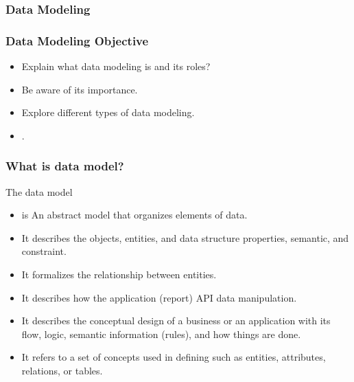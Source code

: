 \VideoClassification[column=1, colour=red]
\subsubsection{Data Modeling}


\begin{frame}
    \frametitle{Data Modeling Objective}
    \begin{itemize}[<+->]
        \item Explain what data modeling is and its roles?
        \item Be aware of its importance.
        \item Explore different types of data modeling.
        \item {}.
    \end{itemize}

\end{frame}


\begin{frame}
    \frametitle{What is data model?}
	The data model
    \begin{itemize}[<+->]
        \item is An abstract model that organizes elements of data.
        \item It describes the objects, entities, and data structure properties, semantic, and constraint.
        \item It formalizes the relationship between entities.
        \item It describes how the application (report) API data manipulation.
        \item It describes the conceptual design of a business or an application with its flow, logic, semantic information (rules), and how things are done.
        \item It refers to a set of concepts used in defining such as entities, attributes, relations, or tables.
    \end{itemize}
\end{frame}

